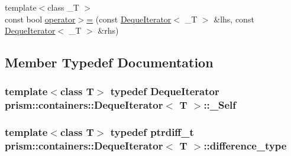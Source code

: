 \begin{DoxyCompactItemize}
\item 
{\footnotesize template$<$class \+\_\+T $>$ }\\const bool \hyperlink{classprism_1_1containers_1_1_deque_iterator_a3beabc9a189a7a45bdc6aa72f4f7b5c4}{operator$>$=} (const \hyperlink{classprism_1_1containers_1_1_deque_iterator}{Deque\+Iterator}$<$ \+\_\+T $>$ \&lhs, const \hyperlink{classprism_1_1containers_1_1_deque_iterator}{Deque\+Iterator}$<$ \+\_\+T $>$ \&rhs)
\end{DoxyCompactItemize}


\subsection{Member Typedef Documentation}
\subsubsection[{\texorpdfstring{\+\_\+\+Self}{_Self}}]{\setlength{\rightskip}{0pt plus 5cm}template$<$class T$>$ typedef {\bf Deque\+Iterator} {\bf prism\+::containers\+::\+Deque\+Iterator}$<$ T $>$\+::{\bf \+\_\+\+Self}}\hypertarget{classprism_1_1containers_1_1_deque_iterator_ad27f6d3d6d64495652855cd194f624fc}{}\label{classprism_1_1containers_1_1_deque_iterator_ad27f6d3d6d64495652855cd194f624fc}
\subsubsection[{\texorpdfstring{difference\+\_\+type}{difference_type}}]{\setlength{\rightskip}{0pt plus 5cm}template$<$class T$>$ typedef ptrdiff\+\_\+t {\bf prism\+::containers\+::\+Deque\+Iterator}$<$ T $>$\+::{\bf difference\+\_\+type}}\hypertarget{classprism_1_1containers_1_1_deque_iterator_a03df377d025d668229049bc0f696d291}{}\label{classprism_1_1containers_1_1_deque_iterator_a03df377d025d668229049bc0f696d291}

